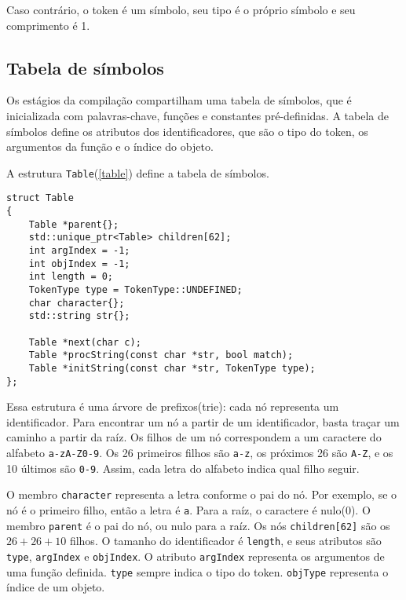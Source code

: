 Caso contrário, o token é um símbolo, seu tipo é o próprio símbolo e seu comprimento é 1.

\subsection{Tabela de símbolos}
Os estágios da compilação compartilham uma tabela de símbolos, que é inicializada com palavras-chave,
funções e constantes pré-definidas.
A tabela de símbolos define os atributos dos identificadores,
que são o tipo do token, os argumentos da função e o índice do objeto.

A estrutura \texttt{Table}(\ref{table}) define a tabela de símbolos.

\begin{lstlisting}[caption=Tabela de símbolos, label=table]
struct Table
{
    Table *parent{};
    std::unique_ptr<Table> children[62];
    int argIndex = -1;
    int objIndex = -1;
    int length = 0;
    TokenType type = TokenType::UNDEFINED;
    char character{};
    std::string str{};

    Table *next(char c);
    Table *procString(const char *str, bool match);
    Table *initString(const char *str, TokenType type);
};
\end{lstlisting}

Essa estrutura é uma árvore de prefixos(trie):
cada nó representa um identificador. Para encontrar um nó a partir de um identificador,
basta traçar um caminho a partir da raíz.
Os filhos de um nó correspondem a um caractere do alfabeto \texttt{a-zA-Z0-9}.
Os 26 primeiros filhos são \texttt{a-z}, os próximos 26 são \texttt{A-Z},
e os 10 últimos são \texttt{0-9}.
Assim, cada letra do alfabeto indica qual filho seguir.

O membro \texttt{character} representa a letra conforme o pai do nó.
Por exemplo, se o nó é o primeiro filho, então a letra é \texttt{a}.
Para a raíz, o caractere é nulo(0).
O membro \texttt{parent} é o pai do nó, ou nulo para a raíz.
Os nós \texttt{children[62]} são os $26+26+10$ filhos.
O tamanho do identificador é \texttt{length}, e seus atributos são
\texttt{type}, \texttt{argIndex} e \texttt{objIndex}.
O atributo \texttt{argIndex} representa os argumentos de uma função definida.
\texttt{type} sempre indica o tipo do token.
\texttt{objType} representa o índice de um objeto.

